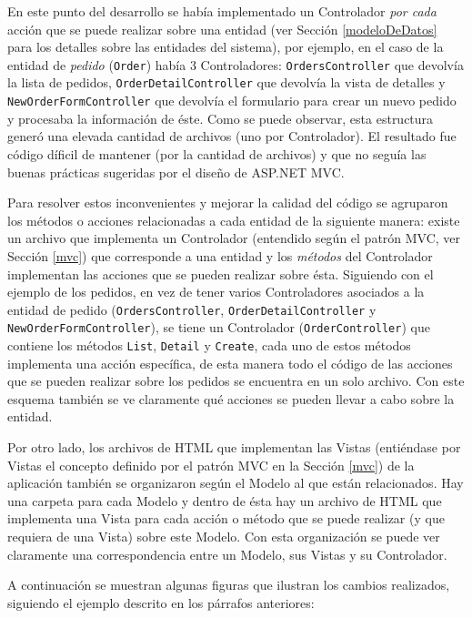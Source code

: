 En este punto del desarrollo se había implementado un Controlador \textit{por cada} acción que se puede realizar sobre una entidad (ver Sección \ref{modeloDeDatos} para los detalles sobre las entidades del sistema), por ejemplo, en el caso de la entidad de \textit{pedido} (\texttt{Order}) había 3 Controladores: \texttt{OrdersCon\-tro\-ller} que devolvía la lista de pedidos, \texttt{OrderDetailContro\-ller} que devolvía la vista de detalles y \texttt{NewOrderFormCon\-tro\-ller} que devolvía el formulario para crear un nuevo pedido y procesaba la información de éste. Como se puede observar, esta estructura generó una elevada cantidad de archivos (uno por Controlador). El resultado fue código díficil de mantener (por la cantidad de archivos) y que no seguía las buenas prácticas sugeridas por el diseño de ASP.NET MVC.

Para resolver estos inconvenientes y mejorar la calidad del código se agruparon los métodos o acciones relacionadas a cada entidad de la siguiente manera: existe un archivo que implementa un Controlador (entendido según el patrón MVC, ver Sección \ref{mvc}) que corresponde a una entidad y los \emph{métodos} del Controlador implementan las acciones que se pueden realizar sobre ésta. Siguiendo con el ejemplo de los pedidos, en vez de tener varios Controladores asociados a la entidad de pedido (\texttt{OrdersController}, \texttt{OrderDetailContro\-ller} y \texttt{NewOrderFormContro\-ller}), se tiene un Controlador (\texttt{OrderController}) que contiene los métodos \texttt{List}, \texttt{Detail} y \texttt{Create}, cada uno de estos métodos implementa una acción específica, de esta manera todo el código de las acciones que se pueden realizar sobre los pedidos se encuentra en un solo archivo. Con este esquema también se ve claramente qué acciones se pueden llevar a cabo sobre la entidad.

Por otro lado, los archivos de HTML que implementan las Vistas (entiéndase por Vistas el concepto definido por el patrón MVC en la Sección \ref{mvc}) de la aplicación también se organizaron según el Modelo al que están relacionados. Hay una carpeta para cada Modelo y dentro de ésta hay un archivo de HTML que implementa una Vista para cada acción o método que se puede realizar (y que requiera de una Vista) sobre este Modelo. Con esta organización se puede ver claramente una correspondencia entre un Modelo, sus Vistas y su Controlador.

A continuación se muestran algunas figuras que ilustran los cambios realizados, siguiendo el ejemplo descrito en los párrafos anteriores:

